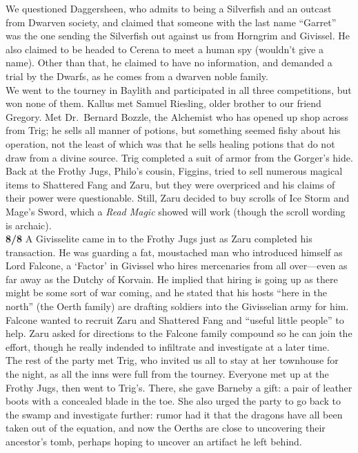 \documentclass[letterpaper]{article}
\begin{document}
\noindent We questioned Daggersheen, who admits to being a Silverfish and an outcast from Dwarven society, and claimed that someone with the last name ``Garret'' was the one sending the Silverfish out against us from Horngrim and Givissel. He also claimed to be headed to Cerena to meet a human spy (wouldn't give a name).  Other than that, he claimed to have no information, and demanded a trial by the Dwarfs, as he comes from a dwarven noble family.\\

\noindent We went to the tourney in Baylith and participated in all three competitions, but won none of them. Kallus met Samuel Riesling, older brother to our friend Gregory.  Met Dr.\ Bernard Bozzle, the Alchemist who has opened up shop across from Trig; he sells all manner of potions, but something seemed fishy about his operation, not the least of which was that he sells healing potions that do not draw from a divine source.  Trig completed a suit of armor from the Gorger's hide. Back at the Frothy Jugs, Philo's cousin, Figgins, tried to sell numerous magical items to Shattered Fang and Zaru, but they were overpriced and his claims of their power were questionable. Still, Zaru decided to buy scrolls of Ice Storm and Mage's Sword, which a \emph{Read Magic} showed will work (though the scroll wording is archaic).\\

\noindent \textbf{8/8} A Givisselite came in to the Frothy Jugs just as Zaru completed his transaction.  He was guarding a fat, moustached man who introduced himself as Lord Falcone, a `Factor' in Givissel who hires mercenaries from all over---even as far away as the Dutchy of Korvain.  He implied that hiring is going up as there might be some sort of war coming, and he stated that his hosts ``here in the north'' (the Oerth family) are drafting soldiers into the Givisselian army for him.  Falcone wanted to recruit Zaru and Shattered Fang and ``useful little people'' to help. Zaru asked for directions to the Falcone family compound so he can join the effort, though he really indended to infiltrate and investigate at a later time.\\

\noindent The rest of the party met Trig, who invited us all to stay at her townhouse for the night, as all the inns were full from the tourney.  Everyone met up at the Frothy Jugs, then went to Trig's.  There, she gave Barneby a gift: a pair of leather boots with a concealed blade in the toe. She also urged the party to go back to the swamp and investigate further: rumor had it that the dragons have all been taken out of the equation, and now the Oerths are close to uncovering their ancestor's tomb, perhaps hoping to uncover an artifact he left behind.\\
\end{document}
